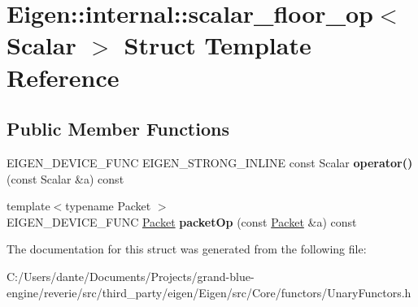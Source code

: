 \hypertarget{struct_eigen_1_1internal_1_1scalar__floor__op}{}\section{Eigen\+::internal\+::scalar\+\_\+floor\+\_\+op$<$ Scalar $>$ Struct Template Reference}
\label{struct_eigen_1_1internal_1_1scalar__floor__op}
\subsection*{Public Member Functions}
\begin{DoxyCompactItemize}
\item 
\mbox{\label{struct_eigen_1_1internal_1_1scalar__floor__op_abb81dcb4a8d662bfd7a03b065d16adca}} 
E\+I\+G\+E\+N\+\_\+\+D\+E\+V\+I\+C\+E\+\_\+\+F\+U\+NC E\+I\+G\+E\+N\+\_\+\+S\+T\+R\+O\+N\+G\+\_\+\+I\+N\+L\+I\+NE const Scalar {\bfseries operator()} (const Scalar \&a) const
\item 
\mbox{\label{struct_eigen_1_1internal_1_1scalar__floor__op_a3ae0504ec80ce06db5d3505aa115bb27}} 
{\footnotesize template$<$typename Packet $>$ }\\E\+I\+G\+E\+N\+\_\+\+D\+E\+V\+I\+C\+E\+\_\+\+F\+U\+NC \mbox{\hyperlink{union_eigen_1_1internal_1_1_packet}{Packet}} {\bfseries packet\+Op} (const \mbox{\hyperlink{union_eigen_1_1internal_1_1_packet}{Packet}} \&a) const
\end{DoxyCompactItemize}


The documentation for this struct was generated from the following file\+:\begin{DoxyCompactItemize}
\item 
C\+:/\+Users/dante/\+Documents/\+Projects/grand-\/blue-\/engine/reverie/src/third\+\_\+party/eigen/\+Eigen/src/\+Core/functors/Unary\+Functors.\+h\end{DoxyCompactItemize}
